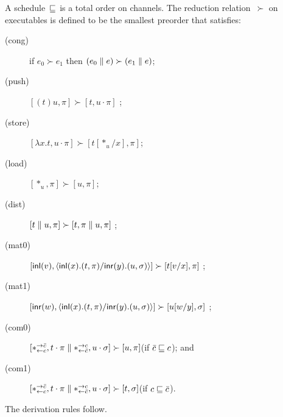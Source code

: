 \newcommand{\red}{\succ}
A schedule~$\sqsubseteq$ is a total order on channels.
The reduction relation~$\red$ on executables
is defined to be the smallest preorder
that satisfies:
\begin{description}
 \item[(cong)] if
      $e_0         \red e_1$
      then
      $(e_0 \conc e) \red (e_1\conc e)$\enspace;
 \item[(push)]
	    $[(t)u,\pi]      \red [t,u\cdot\pi]$      \enspace;
 \item[(store)]
	    $[\lambda x.t,u\cdot\pi]
	     \red
	     [t[\ast_u/x],      \pi]$\enspace;
 \item[(load)]
	    $[\ast_u,\pi]\red [u,\pi]$\enspace;
 \item[(dist)]
           $[t\conc u,\pi]  \red [t,\pi\conc u,\pi]$ \enspace;
 \item[(mat0)]
           $[\inl{v}, \mats xt\pi yu\sigma] \red [t[v/x],\pi] $ \enspace;
 \item[(mat1)]
           $[\inr{w}, \mats xt\pi yu\sigma] \red [u[w/y],\sigma] $ \enspace;
 \item[(com0)]
	    $[\comod c{\co c}, t\cdot\pi\conc \comod{\co c}c,
	    u\cdot\sigma] \red
	    [u,\pi]$\enspace(if $\bar{c}\sqsubseteq c$); and
 \item[(com1)]
	    $[\comod c{\co c}, t\cdot\pi\conc \comod{\co c}c,
	    u\cdot\sigma] \red
	    [t,\sigma]$\enspace(if $c\sqsubseteq \bar{c}$).
\end{description}




The derivation rules follow.\\ \noindent

